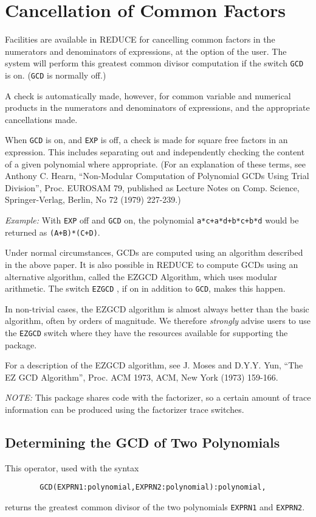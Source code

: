 \documentclass[11pt,letterpaper]{book}
\makeatletter
\newcommand{\REDUCE}{REDUCE}
\newcommand{\underscore}{\_}
\newcommand{\ttindex}[1]{{\renewcommand{\_}{\protect\underscore}%
                          \index{#1@{\tt #1}}}}
\makeatother
\begin{document}
\section{Cancellation of Common Factors}
Facilities are available in {\REDUCE} for cancelling common factors in the
numerators and denominators of expressions, at the option of the user. The
system will perform this greatest common divisor computation if the switch
{\tt GCD}\ttindex{GCD} is on. ({\tt GCD} is normally off.)

A check is automatically made, however, for common variable and numerical
products in the numerators and denominators of expressions, and the
appropriate cancellations made.

When {\tt GCD} is on, and {\tt EXP} is off, a check is made for square
free factors in an expression.  This includes separating out and
independently checking the content of a given polynomial where
appropriate. (For an explanation of these terms, see Anthony C. Hearn,
``Non-Modular Computation of Polynomial GCDs Using Trial Division'', Proc.
EUROSAM 79, published as Lecture Notes on Comp.  Science, Springer-Verlag,
Berlin, No 72 (1979) 227-239.)

{\it Example:} With {\tt EXP}\ttindex{EXP} off and {\tt GCD}\ttindex{GCD}
on,
the polynomial {\tt a*c+a*d+b*c+b*d} would be returned as {\tt (A+B)*(C+D)}.

Under normal circumstances, GCDs are computed using an algorithm described
in the above paper. It is also possible in {\REDUCE} to compute GCDs using
an alternative algorithm, called the EZGCD Algorithm, which uses modular
arithmetic.  The switch {\tt EZGCD}\ttindex{EZGCD}, if on in addition to
{\tt GCD}, makes this happen.

In non-trivial cases, the EZGCD algorithm is almost always better
than the basic algorithm, often by orders of magnitude.  We therefore
{\em strongly\/} advise users to use the {\tt EZGCD} switch where they have the
resources available for supporting the package.

For a description of the EZGCD algorithm, see J. Moses and D.Y.Y. Yun,
``The EZ GCD Algorithm'', Proc. ACM 1973, ACM, New York (1973) 159-166.

{\it NOTE:}
This package shares code with the factorizer, so a certain amount of trace
information can be produced using the factorizer trace switches.

\subsection{Determining the GCD of Two Polynomials}
This operator, used with the syntax
{\small\begin{verbatim}
        GCD(EXPRN1:polynomial,EXPRN2:polynomial):polynomial,
\end{verbatim}}
returns the greatest common divisor of the two polynomials {\tt EXPRN1} and
{\tt EXPRN2}.
\end{document}
